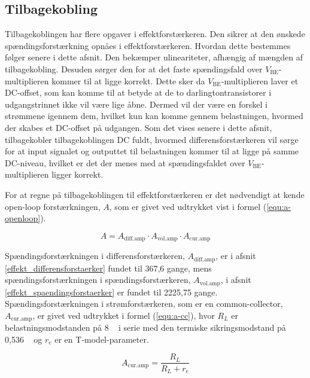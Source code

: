 \subsection{Tilbagekobling}
\label{effekt_tilbagekobling}
Tilbagekoblingen har flere opgaver i effektforstærkeren. Den sikrer at den ønskede spændingsforstærkning opnåes i effektforstærkeren. Hvordan dette bestemmes følger senere i dette afsnit. Den bekæmper ulineariteter, afhængig af mængden af tilbagekobling. Desuden sørger den for at det faste spændingsfald over $V_\mathrm{BE}$-multiplieren kommer til at ligge korrekt. Dette sker da $V_\mathrm{BE}$-multiplieren laver et DC-offset, som kan komme til at betyde at de to darlingtontransistorer i udgangstrinnet ikke vil være lige åbne. Dermed vil der være en forskel i strømmene igennem dem, hvilket kun kan komme gennem belastningen, hvormed der skabes et DC-offset på udgangen. Som det vises senere i dette afsnit, tilbagekobler tilbagekoblingen DC fuldt, hvormed differensforstærkeren vil sørge for at input signalet og outputtet til belastningen kommer til at ligge på samme DC-niveau, hvilket er det der menes med at spændingsfaldet over $V_\mathrm{BE}$-multiplieren ligger korrekt. 

For at regne på tilbagekoblingen til effektforstærkeren er det nødvendigt at kende open-loop forstærkningen, $A$, som er givet ved udtrykket vist i formel (\ref{equ:a-openloop}).

\begin{equation}
\label{equ:a-openloop}
A = A_\mathrm{diff.amp} \cdot A_\mathrm{vol.amp} \cdot A_\mathrm{cur.amp}
\end{equation}

Spændingsforstærkningen i differensforstærkeren, $A_\mathrm{diff.amp}$, er i afsnit \ref{effekt_differensforstaerker} fundet til 367,6 gange, mens spændingsforstærkningen i spændingsforstærkeren, $A_\mathrm{vol.amp}$, i afsnit \ref{effekt_spaendingsforstaerker} er fundet til 2225,75 gange. Spændingsforstærkningen i strømforstærkeren, som er en common-collector, $A_\mathrm{cur.amp}$, er givet ved udtrykket i formel (\ref{equ:a-cc}), hvor $R_L$ er belastningsmodstanden på 8 \ohm~ i serie med den termiske sikringsmodstand på 0,536 \ohm~ og $r_e$ er en T-model-parameter.

\begin{equation}
\label{equ:a-cc}
A_\mathrm{cur.amp} = \frac{R_L}{R_L+r_e}
\end{equation}

